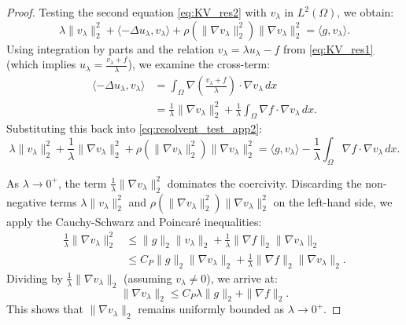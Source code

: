\documentclass[11pt,reqno]{amsart}
\theoremstyle{remark}
\begin{document}
\begin{proof}
Testing the second equation \eqref{eq:KV_res2} with $v_\lambda$ in $L^2(\Omega)$, we obtain:
\begin{equation}\label{eq:resolvent_test_app2}
\lambda \|v_\lambda\|_2^2 + \langle -\Delta u_\lambda, v_\lambda \rangle + \rho(\|\nabla v_\lambda\|_2^2) \|\nabla v_\lambda\|_2^2 = \langle g, v_\lambda \rangle.
\end{equation}
Using integration by parts and the relation $v_\lambda = \lambda u_\lambda - f$ from \eqref{eq:KV_res1} (which implies $u_\lambda = \frac{v_\lambda+f}{\lambda}$), we examine the cross-term:
\begin{align*}
\langle -\Delta u_\lambda, v_\lambda \rangle &= \int_\Omega \nabla \left(\frac{v_\lambda+f}{\lambda}\right) \cdot \nabla v_\lambda \, dx \\
&= \frac{1}{\lambda}\|\nabla v_\lambda\|_2^2 + \frac{1}{\lambda}\int_\Omega \nabla f \cdot \nabla v_\lambda \, dx.
\end{align*}
Substituting this back into \eqref{eq:resolvent_test_app2}:
\begin{equation}
\lambda \|v_\lambda\|_2^2 + \frac{1}{\lambda}\|\nabla v_\lambda\|_2^2 + \rho(\|\nabla v_\lambda\|_2^2) \|\nabla v_\lambda\|_2^2 = \langle g, v_\lambda \rangle - \frac{1}{\lambda}\int_\Omega \nabla f \cdot \nabla v_\lambda \, dx.
\end{equation}

As $\lambda \to 0^+$, the term $\frac{1}{\lambda}\|\nabla v_\lambda\|_2^2$ dominates the coercivity. Discarding the non-negative terms $\lambda \|v_\lambda\|_2^2$ and $\rho(\|\nabla v_\lambda\|_2^2) \|\nabla v_\lambda\|_2^2$ on the left-hand side, we apply the Cauchy-Schwarz and Poincaré inequalities:
\begin{align*}
\frac{1}{\lambda}\|\nabla v_\lambda\|_2^2 &\le \|g\|_2 \|v_\lambda\|_2 + \frac{1}{\lambda} \|\nabla f\|_2 \|\nabla v_\lambda\|_2 \\
&\le C_P \|g\|_2 \|\nabla v_\lambda\|_2 + \frac{1}{\lambda} \|\nabla f\|_2 \|\nabla v_\lambda\|_2.
\end{align*}
Dividing by $\frac{1}{\lambda}\|\nabla v_\lambda\|_2$ (assuming $v_\lambda \neq 0$), we arrive at:
\begin{equation}
\|\nabla v_\lambda\|_2 \le C_P \lambda \|g\|_2 + \|\nabla f\|_2.
\end{equation}
This shows that $\|\nabla v_\lambda\|_2$ remains uniformly bounded as $\lambda \to 0^+$.


\end{proof}
\end{document}
